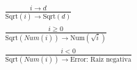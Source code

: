 \documentclass[14pt]{article}
\begin{document}
\begin{enumerate}
   $\begin{gathered} \frac{i \longrightarrow d}{\text{Sqrt}(i) \longrightarrow \text{Sqrt}(d)} \end{gathered}$\\

   $\begin{gathered} \frac{i \geq 0}{\text{Sqrt}(Num(i)) \longrightarrow \text{Num}(\sqrt{i})} \end{gathered}$\\

   $\begin{gathered} \frac{i < 0}{\text{Sqrt}(Num(i)) \longrightarrow \text{Error: Raiz negativa}} \end{gathered}$\\

    
\end{enumerate}
\end{document}
